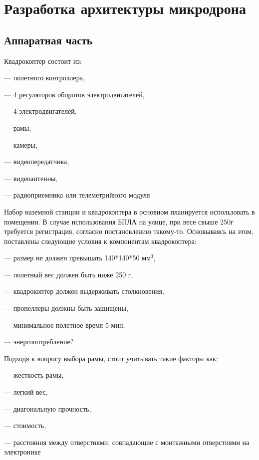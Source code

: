 
\section{Разработка архитектуры микродрона}
\subsection{Аппаратная часть}

Квадрокоптер состоит из:

--- полетного контроллера,

--- 4 регуляторов оборотов электродвигателей,

--- 4 электродвигателей,

--- рамы,

--- камеры,

--- видеопередатчика,

--- видеоантенны,

--- радиоприемника или телеметрийного модуля

Набор наземной станции и квадрокоптера в основном планируется использовать в помещении. В случае использования БПЛА на улице, при весе свыше 250г требуется регистрация, согласно постановлению такому-то. Основываясь на этом, поставлены следующие условия к компонентам квадрокоптера:

--- размер не должен превышать 140*140*50 \(мм^3\),

--- полетный вес должен быть ниже 250 г,

--- квадрокоптер должен выдерживать столкновения,

--- пропеллеры должны быть защищены,

--- минимальное полетное время 5 мин,

--- энергопотребление?

Подходя к вопросу выбора рамы, стоит учитывать такие факторы как:

--- жесткость рамы,

--- легкий вес,

--- диагональную прочность,

--- стоимость,

--- расстояния между отверстиями, совпадающие с монтажными отверстиями на электронике

